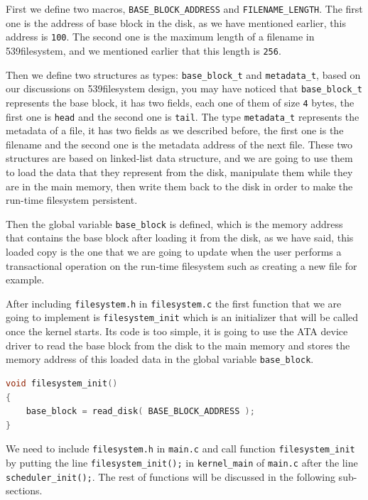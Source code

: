 First we define two macros, \lstinline!BASE_BLOCK_ADDRESS! and
\lstinline!FILENAME_LENGTH!. The first one is the address of base block
in the disk, as we have mentioned earlier, this address is
\lstinline!100!. The second one is the maximum length of a filename in
539filesystem, and we mentioned earlier that this length is
\lstinline!256!.

Then we define two structures as types: \lstinline!base_block_t! and
\lstinline!metadata_t!, based on our discussions on 539filesystem
design, you may have noticed that \lstinline!base_block_t! represents
the base block, it has two fields, each one of them of size
\lstinline!4! bytes, the first one is \lstinline!head! and the second
one is \lstinline!tail!. The type \lstinline!metadata_t! represents the
metadata of a file, it has two fields as we described before, the first
one is the filename and the second one is the metadata address of the
next file. These two structures are based on linked-list data structure,
and we are going to use them to load the data that they represent from
the disk, manipulate them while they are in the main memory, then write
them back to the disk in order to make the run-time filesystem
persistent.

Then the global variable \lstinline!base_block! is defined, which is the
memory address that contains the base block after loading it from the
disk, as we have said, this loaded copy is the one that we are going to
update when the user performs a transactional operation on the run-time
filesystem such as creating a new file for example.

After including \lstinline!filesystem.h! in \lstinline!filesystem.c! the
first function that we are going to implement is
\lstinline!filesystem_init! which is an initializer that will be called
once the kernel starts. Its code is too simple, it is going to use the
ATA device driver to read the base block from the disk to the main
memory and stores the memory address of this loaded data in the global
variable \lstinline!base_block!.

\begin{lstlisting}[language=C]
void filesystem_init()
{
    base_block = read_disk( BASE_BLOCK_ADDRESS );
}
\end{lstlisting}

We need to include \lstinline!filesystem.h! in \lstinline!main.c! and
call function \lstinline!filesystem_init! by putting the line
\lstinline!filesystem_init();! in \lstinline!kernel_main! of
\lstinline!main.c! after the line \lstinline!scheduler_init();!. The
rest of functions will be discussed in the following sub-sections.

